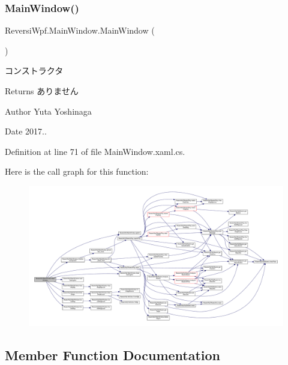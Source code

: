 \subsubsection{\texorpdfstring{Main\+Window()}{MainWindow()}}
{\footnotesize\ttfamily Reversi\+Wpf.\+Main\+Window.\+Main\+Window (\begin{DoxyParamCaption}{ }\end{DoxyParamCaption})}



コンストラクタ 

\begin{DoxyReturn}{Returns}
ありません 
\end{DoxyReturn}
\begin{DoxyAuthor}{Author}
Yuta Yoshinaga 
\end{DoxyAuthor}
\begin{DoxyDate}{Date}
2017.. 
\end{DoxyDate}


Definition at line 71 of file Main\+Window.\+xaml.\+cs.

Here is the call graph for this function\+:
\nopagebreak
\begin{figure}[H]
\begin{center}
\leavevmode
\includegraphics[width=350pt]{class_reversi_wpf_1_1_main_window_af64ecb3857a3d547b4020e9900048360_cgraph}
\end{center}
\end{figure}


\subsection{Member Function Documentation}
\mbox{\label{class_reversi_wpf_1_1_main_window_a4e9c1014738c9b72f093dbc179ce984e}} 
